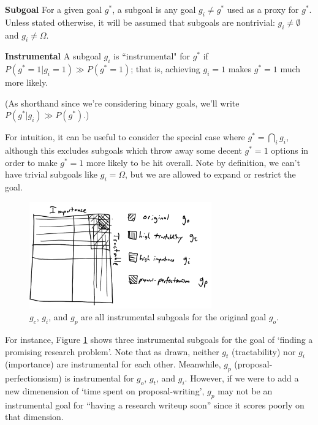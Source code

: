 \documentclass{article}
\begin{document}
\begin{definition}{\textbf{Subgoal}}
    For a given goal $g^*$, a subgoal is any goal $g_i \neq g^*$ used as a proxy for $g^*$. Unless stated otherwise, it will be assumed that subgoals are nontrivial: $g_i \neq \emptyset$ and $g_i \neq \Omega$.
\end{definition}

\begin{definition}{\textbf{Instrumental}}
    A subgoal $g_i$ is ``instrumental" for $g^*$ if $P(g^*=1|g_i=1)\gg P(g^*=1)$; that is, achieving $g_i=1$ makes $g^*=1$ much more likely.
\end{definition}

(As shorthand since we're considering binary goals, we'll write $P(g^*|g_i)\gg P(g^*)$.)

For intuition, it can be useful to consider the special case where $g^* = \bigcap_i g_i$, although this excludes subgoals which throw away some decent $g^*=1$ options in order to make $g^*=1$ more likely to be hit overall. Note by definition, we can't have trivial subgoals like $g_i=\Omega$, but we are allowed to expand or restrict the goal. 

\begin{figure}[ht]
    \centering
    \includegraphics[width=0.7\textwidth]{pics/instrumental.png} 
    \caption{$g_c$, $g_i$, and $g_p$ are all instrumental subgoals for the original goal $g_o$.}
    \label{fig:instrumental} 
\end{figure}

For instance, Figure \ref{fig:instrumental} shows three instrumental subgoals for the goal of `finding a promising research problem'. Note that as drawn, neither $g_t$ (tractability) nor $g_i$ (importance) are instrumental for each other. Meanwhile, $g_p$ (proposal-perfectionsism) is instrumental for $g_o$, $g_t$, and $g_i$. However, if we were to add a new dimenension of `time spent on proposal-writing', $g_p$ may not be an instrumental goal for ``having a research writeup soon'' since it scores poorly on that dimension.
\end{document}

